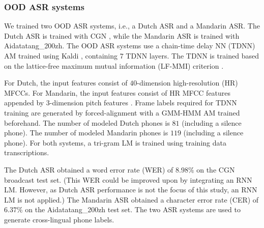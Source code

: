\documentclass[a4paper]{article}
\begin{document}
\subsubsection{OOD ASR systems}
\label{subsubsec:oodasr}
We trained two OOD ASR systems, i.e., a Dutch ASR and a Mandarin ASR. The Dutch ASR is trained with CGN \cite{oostdijk2000spoken}, while the Mandarin ASR is trained with Aidatatang\_200zh.
The OOD ASR systems use a chain-time delay NN (TDNN) AM \cite{povey2016purely} trained using Kaldi \cite{povey2011kaldi}, containing $7$ TDNN layers.  The TDNN   is trained based on the lattice-free maximum mutual information (LF-MMI) criterion \cite{povey2016purely}.

For Dutch, the input features consist of $40$-dimension high-resolution (HR) MFCCs. For Mandarin, the input  features consist of HR MFCC features  appended by $3$-dimension pitch features \cite{ghahremani2014pitch}. 
Frame labels required for TDNN training are generated by forced-alignment with a GMM-HMM AM trained beforehand. The number of modeled Dutch phones is $81$ (including a silence phone).
 The number of modeled Mandarin phones is $119$ (including a silence phone). For both systems, a tri-gram LM is trained using training data transcriptions.

The Dutch ASR obtained a word error rate (WER) of $8.98\%$ on the CGN broadcast test set. 
(This   WER could be improved upon by integrating an   RNN LM. However, as Dutch ASR performance is not the focus of this study, an RNN LM is not applied.)
The Mandarin ASR obtained a character error rate (CER) of $6.37\%$ on the Aidatatang\_200zh test set.
{\color{blue} The two ASR systems are used to generate cross-lingual phone labels.}%




\end{document}
